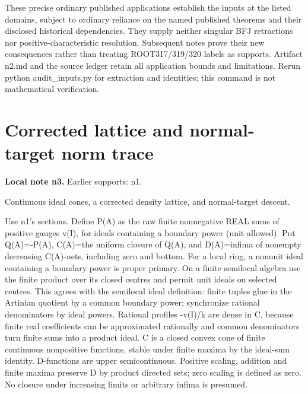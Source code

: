\documentclass[11pt]{article}
\begin{document}
These precise ordinary published applications establish the inputs at the listed domains, subject to ordinary reliance on the named published theorems and their disclosed historical dependencies. They supply neither singular BFJ retractions nor positive-characteristic resolution. Subsequent notes prove their new consequences rather than treating ROOT317/319/320 labels as supports. Artifact n2.md and the source ledger retain all application bounds and limitations. Rerun python audit\_inputs.py for extraction and identities; this command is not mathematical verification.


\section{Corrected lattice and normal-target norm trace}
\label{sec:n3}
\noindent\textbf{Local note n3.} Earlier supports: n1.

Continuous ideal cones, a corrected density lattice, and normal-target descent.

Use n1's sections. Define P(A) as the raw finite nonnegative REAL sums of positive gauges v(I), for ideals containing a boundary power (unit allowed). Put Q(A)=-P(A), C(A)=the uniform closure of Q(A), and D(A)=infima of nonempty decreasing C(A)-nets, including zero and bottom. For a local ring, a nonunit ideal containing a boundary power is proper primary. On a finite semilocal algebra use the finite product over its closed centres and permit unit ideals on selected centres. This agrees with the semilocal ideal definition: finite tuples glue in the Artinian quotient by a common boundary power; synchronize rational denominators by ideal powers. Rational profiles -v(I)/k are dense in C, because finite real coefficients can be approximated rationally and common denominators turn finite sums into a product ideal. C is a closed convex cone of finite continuous nonpositive functions, stable under finite maxima by the ideal-sum identity. D-functions are upper semicontinuous. Positive scaling, addition and finite maxima preserve D by product directed sets; zero scaling is defined as zero. No closure under increasing limits or arbitrary infima is presumed.
\end{document}
